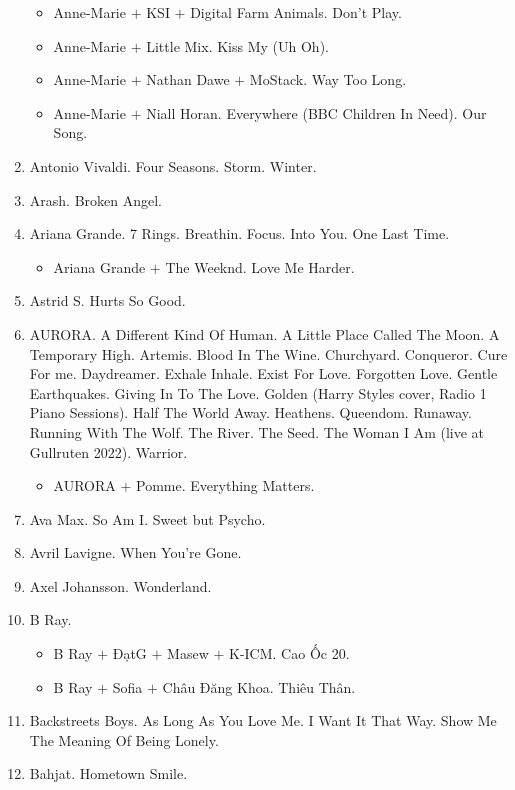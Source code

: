 \documentclass{article}
\begin{document}
\begin{enumerate}
\begin{itemize}
		\item {\sc Anne-Marie $+$ KSI $+$ Digital Farm Animals.} Don't Play.
		\item {\sc Anne-Marie $+$ Little Mix.} Kiss My (Uh Oh).
		\item {\sc Anne-Marie $+$ Nathan Dawe $+$ MoStack.} Way Too Long.
		\item {\sc Anne-Marie $+$ Niall Horan.} Everywhere (BBC Children In Need). Our Song.
	\end{itemize}
	\item {\sc Antonio Vivaldi.} Four Seasons. Storm. Winter.
	\item {\sc Arash.} Broken Angel.
	\item {\sc Ariana Grande.} 7 Rings. Breathin. Focus. Into You. One Last Time.
	\begin{itemize}
		\item {\sc Ariana Grande $+$ The Weeknd.} Love Me Harder.
	\end{itemize}
	\item {\sc Astrid S.} Hurts So Good.
	\item {\sc AURORA.} A Different Kind Of Human. A Little Place Called The Moon. A Temporary High. Artemis. Blood In The Wine. Churchyard. Conqueror. Cure For me. Daydreamer. Exhale Inhale. Exist For Love. Forgotten Love. Gentle Earthquakes. Giving In To The Love. Golden (Harry Styles  cover, Radio 1 Piano Sessions). Half The World Away. Heathens. Queendom. Runaway. Running With The Wolf. The River. The Seed. The Woman I Am (live at Gullruten 2022). Warrior.
	\begin{itemize}
		\item {\sc AURORA $+$ Pomme.} Everything Matters.
	\end{itemize}
	\item {\sc Ava Max.} So Am I. Sweet but Psycho.	
	\item {\sc Avril Lavigne.} When You're Gone.
	\item {\sc Axel Johansson.} Wonderland.
	\item {\sc B Ray.}
	\begin{itemize}
		\item {\sc B Ray $+$ ĐạtG $+$ Masew $+$ K-ICM.} Cao Ốc 20.
		\item {\sc B Ray $+$ Sofia $+$ Châu Đăng Khoa.} Thiêu Thân.
	\end{itemize}
	\item {\sc Backstreets Boys.} As Long As You Love Me. I Want It That Way. Show Me The Meaning Of Being Lonely.
	\item {\sc Bahjat.} Hometown Smile.

\end{enumerate}
\end{document}
